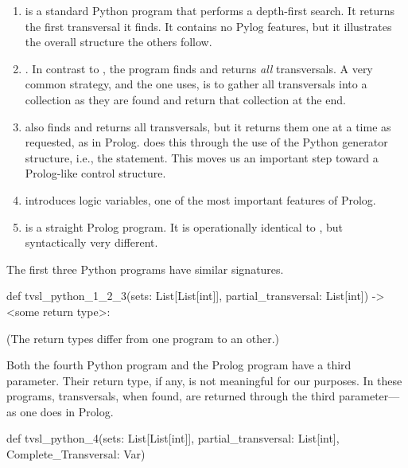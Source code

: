 \begin{enumerate}
\item {} is a standard Python program that performs a depth-first search. It returns the first transversal it finds. It contains no Pylog features, but it illustrates the overall structure the others follow. 
\item {}. In contrast to , the program  finds and returns \textit{all} transversals. A very common strategy, and the one  uses, is to gather all transversals into a collection as they are found and return that collection at the end.

\item {} also finds and returns all transversals, but it returns them one at a time as requested, as in Prolog.  does this through the use of the Python generator structure, i.e., the  statement. This moves us an important step toward a Prolog-like control structure.
\smallv
\item {} introduces logic variables, one of the most important features of Prolog.  
\item {} is a straight Prolog program. It is operationally identical to , but syntactically very different. 
\end{enumerate}

The first three Python programs have similar signatures. 

\begin{python}
def tvsl_python_1_2_3(sets: List[List[int]], 
                      partial_transversal: List[int])
                             -> <some return type>: 
\end{python}
(The return types differ from one program to an other.)

Both the fourth Python program and the Prolog program have a third parameter. Their return type, if any, is not meaningful for our purposes. In these programs, transversals, when found, are returned through the third parameter---as one does in Prolog.

\begin{python}
def tvsl_python_4(sets: List[List[int]], 
                  partial_transversal: List[int],
                  Complete_Transversal: Var)
\end{python}

